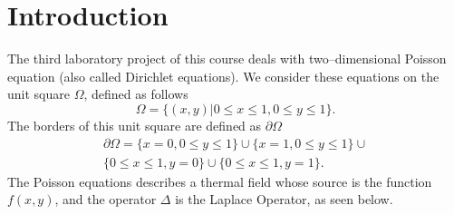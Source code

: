 \documentclass[a4paper,12pt,reqno]{article}
\title{\titl}
\author{\auth}
\date{\today}
\begin{document}
\maketitle
\tableofcontents

\section{Introduction}

\noindent
The third laboratory project of this course deals with two--dimensional Poisson
equation (also called Dirichlet equations). We consider these equations on the
unit square $\Omega$, defined as follows
\begin{equation}\nonumber
    \Omega = \{(x,y) | 0 \le x \le 1, 0 \le y \le 1 \}.
\end{equation}
\noindent
The borders of this unit square are defined as $\partial \Omega$
\begin{equation}\nonumber
    \begin{gathered}
        \partial \Omega = \{ x = 0, 0 \le y \le 1 \} \cup 
        \{ x = 1, 0 \le y \le 1\} \cup \\
        \{0 \le x \le 1 , y = 0\} \cup 
        \{0 \le x \le 1, y = 1 \}.
    \end{gathered}
\end{equation}
\noindent
The Poisson equations describes a thermal field whose source is the function
$f(x,y)$, and the operator $\Delta$ is the Laplace Operator, as seen below.
\end{document}
